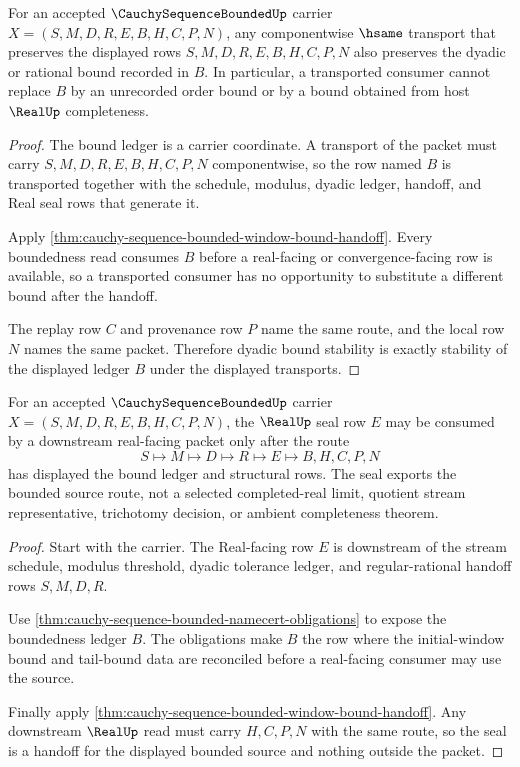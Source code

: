 \begin{theorem}\label{thm:cauchy-sequence-bounded-dyadic-bound-stability}
For an accepted $\CauchySequenceBoundedUp$ carrier $X=(S,M,D,R,E,B,H,C,P,N)$, any componentwise $\hsame$ transport that preserves the displayed rows $S,M,D,R,E,B,H,C,P,N$ also preserves the dyadic or rational bound recorded in $B$. In particular, a transported consumer cannot replace $B$ by an unrecorded order bound or by a bound obtained from host $\RealUp$ completeness.
\end{theorem}
\begin{proof}
The bound ledger is a carrier coordinate. A transport of the packet must carry $S,M,D,R,E,B,H,C,P,N$ componentwise, so the row named $B$ is transported together with the schedule, modulus, dyadic ledger, handoff, and Real seal rows that generate it.

Apply \autoref{thm:cauchy-sequence-bounded-window-bound-handoff}. Every boundedness read consumes $B$ before a real-facing or convergence-facing row is available, so a transported consumer has no opportunity to substitute a different bound after the handoff.

The replay row $C$ and provenance row $P$ name the same route, and the local row $N$ names the same packet. Therefore dyadic bound stability is exactly stability of the displayed ledger $B$ under the displayed transports.
\end{proof}

\begin{theorem}\label{thm:cauchy-sequence-bounded-real-seal-handoff}
For an accepted $\CauchySequenceBoundedUp$ carrier $X=(S,M,D,R,E,B,H,C,P,N)$, the $\RealUp$ seal row $E$ may be consumed by a downstream real-facing packet only after the route
$$
S\longmapsto M\longmapsto D\longmapsto R\longmapsto E\longmapsto B,H,C,P,N
$$
has displayed the bound ledger and structural rows. The seal exports the bounded source route, not a selected completed-real limit, quotient stream representative, trichotomy decision, or ambient completeness theorem.
\end{theorem}
\begin{proof}
Start with the carrier. The Real-facing row $E$ is downstream of the stream schedule, modulus threshold, dyadic tolerance ledger, and regular-rational handoff rows $S,M,D,R$.

Use \autoref{thm:cauchy-sequence-bounded-namecert-obligations} to expose the boundedness ledger $B$. The obligations make $B$ the row where the initial-window bound and tail-bound data are reconciled before a real-facing consumer may use the source.

Finally apply \autoref{thm:cauchy-sequence-bounded-window-bound-handoff}. Any downstream $\RealUp$ read must carry $H,C,P,N$ with the same route, so the seal is a handoff for the displayed bounded source and nothing outside the packet.
\end{proof}

